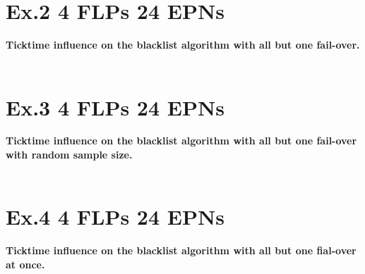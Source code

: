\section{Ex.2 4 FLPs 24 EPNs}
\textbf{Ticktime influence on the blacklist algorithm with all but one fail-over.}
\\\\

\section{Ex.3 4 FLPs 24 EPNs}
\textbf{Ticktime influence on the blacklist algorithm with all but one fail-over with random sample size.}
\\\\

\section{Ex.4 4 FLPs 24 EPNs}
\textbf{Ticktime influence on the blacklist algorithm with all but one fial-over at once.}